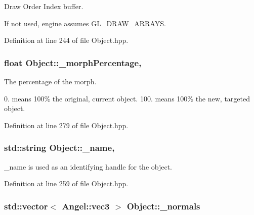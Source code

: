 Draw Order Index buffer. 

If not used, engine assumes G\-L\-\_\-\-D\-R\-A\-W\-\_\-\-A\-R\-R\-A\-Y\-S. 

Definition at line 244 of file Object.\-hpp.

\hypertarget{class_object_a7fbbac9027e1a8266342bd5ce064120d}{
\subsubsection[{\-\_\-morph\-Percentage}]{\setlength{\rightskip}{0pt plus 5cm}float Object\-::\-\_\-morph\-Percentage\hspace{0.3cm}{\ttfamily [protected]}, {\ttfamily [inherited]}}}\label{class_object_a7fbbac9027e1a8266342bd5ce064120d}


The percentage of the morph. 

0. means 100\% the original, current object. 100. means 100\% the new, targeted object. 

Definition at line 279 of file Object.\-hpp.

\hypertarget{class_object_a3f617214b260ebbe394e7c7b08ab5e43}{
\subsubsection[{\-\_\-name}]{\setlength{\rightskip}{0pt plus 5cm}std\-::string Object\-::\-\_\-name\hspace{0.3cm}{\ttfamily [protected]}, {\ttfamily [inherited]}}}\label{class_object_a3f617214b260ebbe394e7c7b08ab5e43}


\-\_\-name is used as an identifying handle for the object. 



Definition at line 259 of file Object.\-hpp.

\hypertarget{class_object_a20bb786cb5915934853855aab9d1a1b3}{
\subsubsection[{\-\_\-normals}]{\setlength{\rightskip}{0pt plus 5cm}std\-::vector$<$ {\bf Angel\-::vec3} $>$ Object\-::\-\_\-normals\hspace{0.3cm}{\ttfamily [inherited]}}}\label{class_object_a20bb786cb5915934853855aab9d1a1b3}


